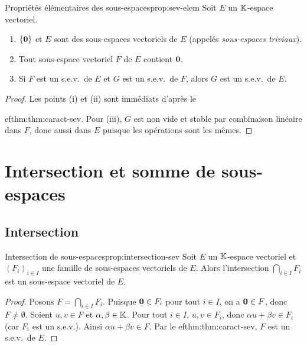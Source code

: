 \begin{proposition}{Propriétés élémentaires des sous-espaces}{prop:sev-elem}
  Soit $E$ un ${\mathbb{K}}$-espace vectoriel.
  \begin{enumerate}[label=(\roman*)]
    \item $\left\{\mathbf{0}\right\}$ et $E$ sont des sous-espaces vectoriels de $E$
      (appelés \emph{sous-espaces triviaux}).
    \item Tout sous-espace vectoriel $F$ de $E$ contient $\mathbf{0}$.
    \item Si $F$ est un s.e.v.\ de $E$ et $G$ est un s.e.v.\ de $F$,
      alors $G$ est un s.e.v.\ de $E$.
  \end{enumerate}
\end{proposition}

\begin{proof}
  Les points (i) et (ii) sont immédiats d'après le
  
ef{thm:thm:caract-sev}. Pour (iii), $G$ est non vide et stable par
  combinaison linéaire dans $F$, donc aussi dans $E$ puisque les
  opérations sont les mêmes.
\end{proof}

\section{Intersection et somme de sous-espaces}\label{sec:intersection-somme}

\subsection{Intersection}\label{subsec:intersection}

\begin{proposition}{Intersection de sous-espaces}{prop:intersection-sev}
  Soit $E$ un ${\mathbb{K}}$-espace vectoriel et $(F_i)_{i\in I}$ une famille de
  sous-espaces vectoriels de $E$. Alors l'intersection
  $\displaystyle\bigcap_{i\in I}F_i$ est un sous-espace vectoriel de $E$.
\end{proposition}

\begin{proof}
  Posons $F=\bigcap_{i\in I}F_i$. Puisque $\mathbf{0}\in F_i$ pour tout
  $i\in I$, on a $\mathbf{0}\in F$, donc $F\neq\emptyset$. Soient
  $u,v\in F$ et $\alpha,\beta\in{\mathbb{K}}$. Pour tout $i\in I$, $u,v\in F_i$,
  donc $\alpha u+\beta v\in F_i$ (car $F_i$ est un s.e.v.). Ainsi
  $\alpha u+\beta v\in F$. Par le 
ef{thm:thm:caract-sev}, $F$ est un
  s.e.v.\ de $E$.
\end{proof}

